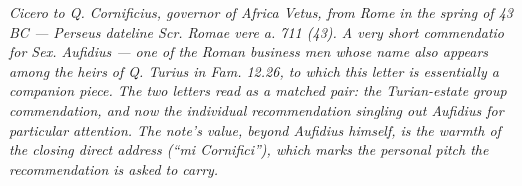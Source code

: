 
\textit{Cicero to Q. Cornificius, governor of Africa Vetus, from Rome in the
spring of 43 BC --- Perseus dateline \textit{Scr. Romae vere a. 711 (43)}.
A very short commendatio for Sex. Aufidius --- one of the Roman business
men whose name also appears among the heirs of Q. Turius in Fam. 12.26,
to which this letter is essentially a companion piece. The two letters
read as a matched pair: the Turian-estate group commendation, and now
the individual recommendation singling out Aufidius for particular
attention. The note's value, beyond Aufidius himself, is the warmth of
the closing direct address (``mi Cornifici''), which marks the
personal pitch the recommendation is asked to carry.}
